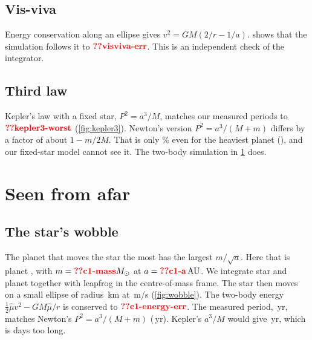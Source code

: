 \documentclass[aps,prd,twocolumn,nofootinbib,floatfix,superscriptaddress]{revtex4-2}
\begin{document}
\subsection{Vis-viva}
Energy conservation along an ellipse gives $v^2=GM(2/r-1/a)$.
 shows that the simulation follows it to $\val{visviva-err}$.
This is an independent check of the integrator.

\subsection{Third law}
Kepler's law with a fixed star, $P^2=a^3/M$, matches our measured periods to $\val{kepler3-worst}$ (\cref{fig:kepler3}).
Newton's version $P^2=a^3/(M+m)$ differs by a factor of about $1-m/2M$.
That is only \% even for the heaviest planet (), and our fixed-star model cannot see it.
The two-body simulation in \cref{sec:wobble} does.


\section{Seen from afar}\label{sec:wobble}
\subsection{The star's wobble}
The planet that moves the star the most has the largest $m/\sqrt a$.
Here that is planet , with $m=\val{c1-mass}\Msun$ at $a=\val{c1-a}\AU$.
We integrate star and planet together with leapfrog in the centre-of-mass frame.
The star then moves on a small ellipse of radius \,km at \,m/s (\cref{fig:wobble}).
The two-body energy $\tfrac12\hat\mu v^2-GM\hat\mu/r$ is conserved to $\val{c1-energy-err}$.
The measured period, \,yr, matches Newton's $P^2=a^3/(M+m)$ (\,yr).
Kepler's $a^3/M$ would give \,yr, which is  days too long.
\end{document}

